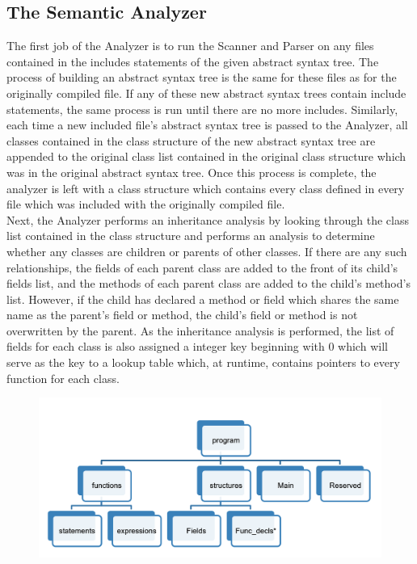 \begin{homeworkProblem}
	\subsection{The Semantic Analyzer}
	The first job of the Analyzer is to run the Scanner and Parser on any files contained in the includes statements of the given abstract syntax tree. The process of building an abstract syntax tree is the same for these files as for the originally compiled file. If any of these new abstract syntax trees contain include statements, the same process is run until there are no more includes. Similarly, each time a new included file's abstract syntax tree is passed to the Analyzer, all classes contained in the class structure of the new abstract syntax tree are appended to the original class list contained in the original class structure which was in the original abstract syntax tree. Once this process is complete, the analyzer is left with a class structure which contains every class defined in every file which was included with the originally compiled file.\\
	Next, the Analyzer performs an inheritance analysis by looking through the class list contained in the class structure and performs an analysis to determine whether any classes are children or parents of other classes. If there are any such relationships, the fields of each parent class are added to the front of its child's fields list, and the methods of each parent class are added to the child's method's list. However, if the child has declared a method or field which shares the same name as the parent's field or method, the child's field or method is not overwritten by the parent. As the inheritance analysis is performed, the list of fields for each class is also assigned a integer key beginning with 0 which will serve as the key to a lookup table which, at runtime, contains pointers to every function for each class.\\
	\begin{figure}[!ht]
		\centering
		\includegraphics[width=4.5in]{Includes/sast}

\end{figure}
\end{homeworkProblem}
